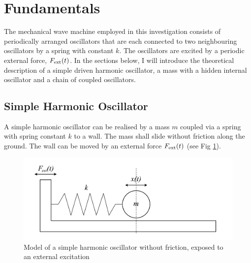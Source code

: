 \documentclass[12pt]{article}
\begin{document}
\clearpage

\section{Fundamentals}\label{Fundamentals}
The mechanical wave machine employed in this investigation consists of periodically arranged oscillators that are each connected to two neighbouring oscillators by a spring with constant $k$. The oscillators are excited by a periodic external force, $F_{\rm ext}(t)$. In the sections below, I will introduce the theoretical description of a simple driven harmonic oscillator, a mass with a hidden internal oscillator and a chain of coupled oscillators.

\subsection{Simple Harmonic Oscillator}  
A simple harmonic oscillator can be realised by a mass $m$ coupled via a spring with spring constant $k$ to a wall. The mass shall slide without friction along the ground. The wall can be moved by an external force $F_{\rm ext}(t)$ (see Fig \ref{fig:SHO}).

\begin{figure}[hbt]
  \includegraphics[width=\columnwidth]{fundamentals/simple_harmonic_oscillator.pdf}
  \caption{Model of a simple harmonic oscillator without friction, exposed to an external excitation}\label{fig:SHO}
\end{figure}
\end{document}
